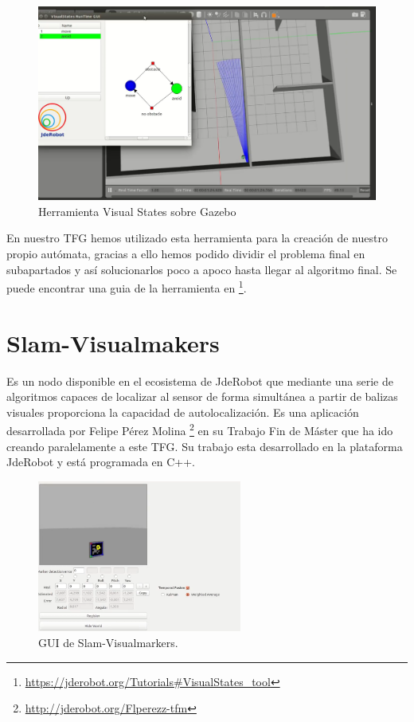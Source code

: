 \begin{figure}[H]
	\begin{center}
		\includegraphics[width=1\textwidth]{imag/IMG19.png}
				\caption{Herramienta Visual States sobre Gazebo} 
	\label{fig:Visual States.}	
	\end{center}
\end{figure}

\hspace{1cm} En nuestro TFG hemos utilizado esta herramienta para la creación de nuestro propio autómata, gracias a ello hemos podido dividir el problema final en subapartados y así solucionarlos poco a apoco hasta llegar al algoritmo final. Se puede encontrar una guia de la herramienta en \footnote{\url{https://jderobot.org/Tutorials\#VisualStates_tool}}.

\section{Slam-Visualmakers}
\hspace{1cm} Es un nodo disponible en el ecosistema de JdeRobot que  mediante una serie de algoritmos capaces de localizar al sensor de forma simultánea a partir de balizas visuales proporciona la capacidad de autolocalización. Es una aplicación desarrollada por Felipe Pérez Molina \footnote{\url{http://jderobot.org/Flperezz-tfm}} en su Trabajo Fin de Máster que ha ido creando paralelamente a este TFG. Su trabajo esta desarrollado en la plataforma JdeRobot y está programada en C++. 

\begin{figure}[H]
	\begin{center}
		\includegraphics[width=0.6\textwidth]{imag/IMG24.png}
				\caption{GUI de Slam-Visualmarkers.} 
	\label{fig:GUI de Slam-Visualmarkers.}	
	\end{center}
\end{figure}

